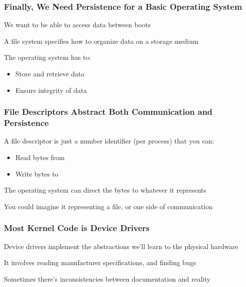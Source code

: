   \begin{frame}
    \frametitle{Finally, We Need Persistence for a Basic Operating System}

    We want to be able to access data between boots

    \vspace{2em}

    A file system specifies how to organize data on a storage medium

    \vspace{4em}
    
    The operating system has to:
    \begin{itemize}
      \item Store and retrieve data
      \item Ensure integrity of data
    \end{itemize}
  \end{frame}

  \begin{frame}
    \frametitle{File Descriptors Abstract Both Communication and Persistence}

    A file descriptor is just a number identifier (per process) that you can:
    \begin{itemize}
      \item Read bytes from
      \item Write bytes to 
    \end{itemize}

    \vspace{4em}

    The operating system can direct the bytes to whatever it represents

    \vspace{2em}

    You could imagine it representing a file, or one side of communication
  \end{frame}

  \begin{frame}
    \frametitle{Most Kernel Code is Device Drivers}

    Device drivers implement the abstractions we'll learn to the physical hardware

    \vspace{2em}

    It involves reading manufacturer specifications, and finding bugs

    \vspace{2em}

    Sometimes there's inconsistencies between documentation and reality
  \end{frame}

